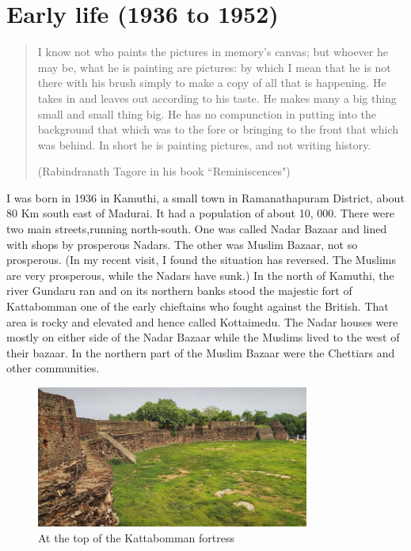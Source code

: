 \chapter{Early life (1936 to 1952)}

\begin{quote}
I know not who paints the pictures in memory's canvas; but whoever
he may be, what he is painting are pictures: by which I mean that 
he is not there with his brush simply to make a copy of all that is
happe\-ning. He takes in and leaves out according to his taste. He
makes many a big thing small and small thing big. He has no compunction 
in putting into the background that which was to the fore or bringing
to the front that which was behind. In short he is painting pictures, 
and not writing history.

\hfill (Rabindranath Tagore in his book ``Reminiscences")
\end{quote}

I was born in 1936 in Kamuthi, a small town in Ramanathapuram District, 
about 80 Km south east of Madurai. It had a population of about 10, 000. 
There were two main streets,\break running north-south. One was called Nadar 
Bazaar and lined with shops by prosperous Nadars. The other was Muslim 
Bazaar, not so prosperous. (In my recent visit, I found the situation 
has reversed. The Muslims are very prosperous, while the Nadars have 
sunk.) In the north of Kamuthi, the river Gundaru ran and on its 
northern banks stood the majestic fort of Kattabomman one of the early 
chieftains who fought against the British. That area is rocky and 
elevated and hence called Kottaimedu. The Nadar houses were mostly on 
either side of the Nadar Bazaar while the Muslims lived to the west of 
their bazaar. In the northern part of the Muslim Bazaar were the 
Chettiars and other communities.
\newpage

\begin{figure}[H]
\centering
\includegraphics[width=0.8\textwidth]{images/new-images/01-Rajaji-fort.jpg}
\caption{At the top of the Kattabomman fortress}
\end{figure}

